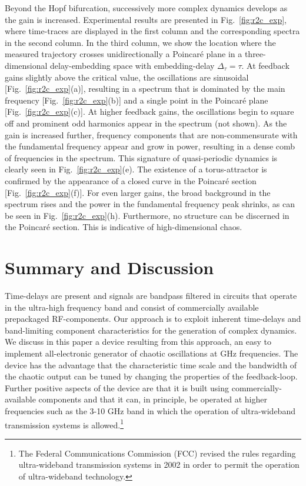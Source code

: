 \documentclass[aps,twocolumn,pre,nofootinbib]{revtex4}
\begin{document}
Beyond the Hopf bifurcation, successively more complex dynamics develops as the gain is increased. Experimental results are presented in Fig.~\ref{fig:r2c_exp}, where time-traces are displayed in the first column and the corresponding spectra in the second column. In the third column, we show the location where the measured trajectory crosses unidirectionally a Poincar\'{e} plane in a three-dimensional delay-embedding space with embedding-delay $\Delta_{\tau} \! = \! \tau$.
%
At feedback gains slightly above the critical value, the oscillations are sinusoidal [Fig.~\ref{fig:r2c_exp}(a)], resulting in a spectrum that is dominated by the main frequency [Fig.~\ref{fig:r2c_exp}(b)] and a single point in the Poincar\'{e} plane [Fig.~\ref{fig:r2c_exp}(c)].
%
At higher feedback gains, the oscillations begin to square off and prominent odd harmonics appear in the spectrum (not shown). As the gain is increased further, frequency components that are non-commensurate with the fundamental frequency appear and grow in power, resulting in a dense comb of frequencies in the spectrum. This signature of quasi-periodic dynamics is clearly seen in Fig.~\ref{fig:r2c_exp}(e). The existence of a torus-attractor is confirmed by the appearance of a closed curve in the Poincar\'{e} section [Fig.~\ref{fig:r2c_exp}(f)]. 
%
For even larger gains, the broad background in the spectrum rises and the power in the fundamental frequency peak shrinks, as can be seen in Fig.~\ref{fig:r2c_exp}(h). Furthermore, no structure can be discerned in the Poincar\'{e} section. This is indicative of high-dimensional chaos. 


\section{Summary and Discussion}

Time-delays are present and signals are bandpass filtered in circuits that operate in the ultra-high frequency band and consist of commercially available prepackaged RF-components.
Our approach is to exploit inherent time-delays and band-limiting component characteristics for the generation of complex dynamics. We discuss in this paper a device resulting from this approach, an easy to implement all-electronic generator of  chaotic oscillations at GHz frequencies. The device has the advantage that the characteristic time scale and the bandwidth of the chaotic output can be tuned by changing the properties of the feedback-loop. Further positive aspects of the device are that it is built using commercially-available components and that it can, in principle, be operated at higher frequencies such as the 3-10 GHz band in which the operation of ultra-wideband transmission systems is allowed.\footnote{The Federal Communications Commission (FCC) revised the rules regarding ultra-wideband transmission systems in 2002 in order to permit the operation of ultra-wideband technology.}
\end{document}

